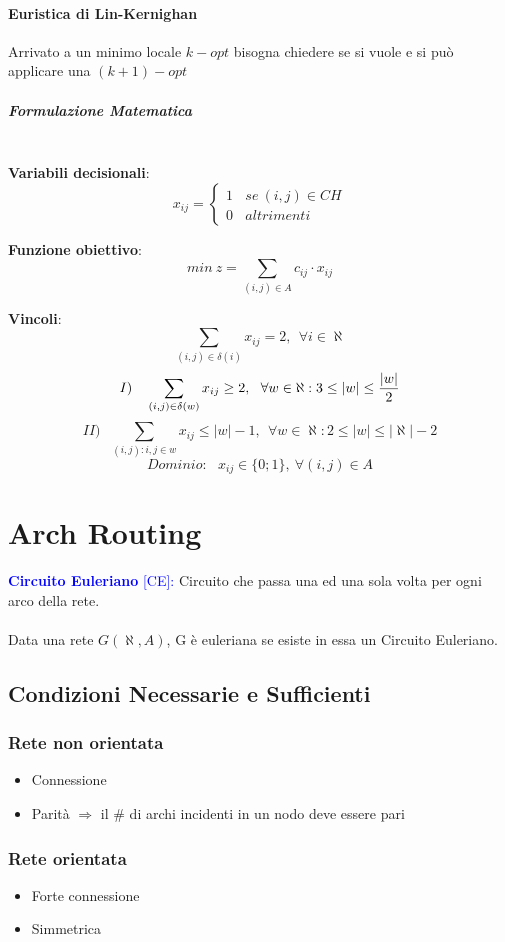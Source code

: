 \documentclass[12pt,a4paper]{article}
\begin{document}
\paragraph{Euristica di Lin-Kernighan}
Arrivato a un minimo locale $k-opt$ bisogna chiedere se si vuole e si può applicare una $(k+1)-opt$
\subparagraph{Formulazione Matematica\\ \\}
\textbf{Variabili decisionali}:
\begin{equation*}
x_{ij} = \begin{cases}
1 \ \ \ \ se \ (i,j) \in CH\\
0 \ \ \ \ altrimenti
\end{cases}
\end{equation*}

\textbf{Funzione obiettivo}: $$min\ z = \sum_{(i,j) \in A} c_{ij} \cdot x_{ij}$$

\textbf{Vincoli}: $$\sum_{(i,j) \in \delta (i)} x_{ij} = 2,\ \ \forall i \in \aleph$$
$$I) \ \ \ \sum_{(i,j) \in \delta (w)} x_{ij} \geq 2,\ \ \forall w \in \aleph : 3 \leq |w| \leq {|w| \over 2}$$
$$II) \ \ \ \sum_{(i,j) : i,j \in w} x_{ij} \leq |w| -1,\ \ \forall w \in \aleph : 2 \leq |w| \leq |\aleph|- 2$$
$$Dominio: \ \ \ x_{ij} \in \{0;1\}, \ \forall (i,j) \in A$$

\clearpage
\section{Arch Routing}
\textcolor{blue}{\textbf{Circuito Euleriano} [CE]:} Circuito che passa una ed una sola volta per ogni arco della rete.\\ \\
Data una rete $G(\aleph, A)$, G è euleriana se esiste in essa un Circuito Euleriano.

\subsection{Condizioni Necessarie e Sufficienti}
\subsubsection{Rete non orientata}
\begin{itemize}
\item Connessione
\item Parità $\Rightarrow$ il \# di archi incidenti in un nodo deve essere pari
\end{itemize}
\subsubsection{Rete orientata}
\begin{itemize}
\item Forte connessione
\item Simmetrica
\end{itemize}
\end{document}
